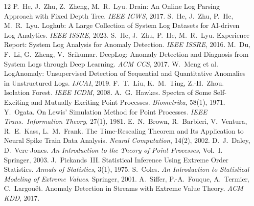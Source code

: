 \documentclass[11pt,a4paper]{report}
\begin{document}
\begin{thebibliography}{12}
\small
{} P.~He, J.~Zhu, Z.~Zheng, M.~R.~Lyu. Drain: An Online Log
Parsing Approach with Fixed Depth Tree. \emph{IEEE ICWS}, 2017.
 S.~He, J.~Zhu, P.~He, M.~R.~Lyu. Loghub: A Large
Collection of System Log Datasets for AI-driven Log Analytics. \emph{IEEE
ISSRE}, 2023.
 S.~He, J.~Zhu, P.~He, M.~R.~Lyu. Experience Report:
System Log Analysis for Anomaly Detection. \emph{IEEE ISSRE}, 2016.
 M.~Du, F.~Li, G.~Zheng, V.~Srikumar. DeepLog: Anomaly
Detection and Diagnosis from System Logs through Deep Learning. \emph{ACM
CCS}, 2017.
 W.~Meng et al. LogAnomaly: Unsupervised Detection of
Sequential and Quantitative Anomalies in Unstructured Logs. \emph{IJCAI},
2019.
 F.~T.~Liu, K.~M.~Ting, Z.-H.~Zhou. Isolation Forest.
\emph{IEEE ICDM}, 2008.
 A.~G.~Hawkes. Spectra of Some Self-Exciting and Mutually
Exciting Point Processes. \emph{Biometrika}, 58(1), 1971.
 Y.~Ogata. On Lewis' Simulation Method for Point Processes.
\emph{IEEE Trans.\ Information Theory}, 27(1), 1981.
 E.~N.~Brown, R.~Barbieri, V.~Ventura, R.~E.~Kass,
L.~M.~Frank. The Time-Rescaling Theorem and Its Application to Neural
Spike Train Data Analysis. \emph{Neural Computation}, 14(2), 2002.
 D.~J.~Daley, D.~Vere-Jones. \emph{An Introduction to the
Theory of Point Processes}, Vol.~I. Springer, 2003.
 J.~Pickands~III. Statistical Inference Using Extreme
Order Statistics. \emph{Annals of Statistics}, 3(1), 1975.
 S.~Coles. \emph{An Introduction to Statistical Modeling of
Extreme Values}. Springer, 2001.
 A.~Siffer, P.-A.~Fouque, A.~Termier, C.~Largou\"et. Anomaly
Detection in Streams with Extreme Value Theory. \emph{ACM KDD}, 2017.
\end{thebibliography}

\appendix
\end{document}
